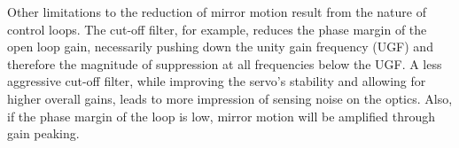 Other limitations to the reduction of mirror motion result from the nature of control loops. The cut-off filter, for example, reduces the phase margin of the open loop gain, necessarily pushing down the unity gain frequency (UGF) and therefore the magnitude of suppression at all frequencies below the UGF. A less aggressive cut-off filter, while improving the servo's stability and allowing for higher overall gains, leads to more impression of sensing noise on the optics. Also, if the phase margin of the loop is low, mirror motion will be amplified through gain peaking.





